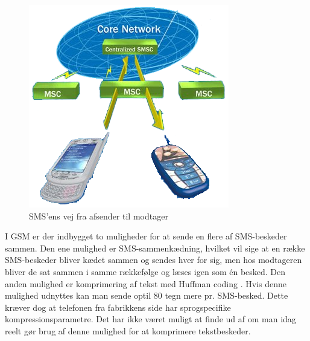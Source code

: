 \begin{figure}[H]
\centering
\includegraphics []{Billeder/GSMnetvaerk.png}
\caption {SMS'ens vej fra afsender til modtager \cite{info}}
\label {GSM}
\end{figure} 

I GSM er der indbygget to muligheder for at sende en flere af SMS-beskeder sammen. Den ene mulighed er SMS-sammenkædning, hvilket vil sige at en række SMS-beskeder bliver kædet sammen og sendes hver for sig, men hos modtageren bliver de sat sammen i samme rækkefølge og læses igen som én besked. Den anden mulighed er komprimering af tekst med Huffman coding \cite{UNI}. Hvis denne mulighed udnyttes kan man sende optil 80 tegn mere pr. SMS-besked. Dette kræver dog at telefonen fra fabrikkens side har sprogspecifike kompressionsparametre. Det har ikke været muligt at finde ud af om man idag reelt gør brug af denne mulighed for at komprimere tekstbeskeder. 
